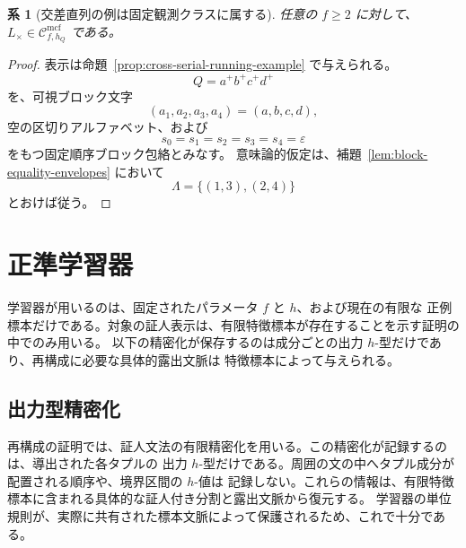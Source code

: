 \documentclass[11pt,a4paper]{ltjsarticle}
\newtheorem{corollary}[theorem]{系}
\theoremstyle{remark}
\newcommand{\Cmcf}[2]{\mathcal{C}^{\mathrm{mcf}}_{#1,#2}}
\newcommand{\eps}{\varepsilon}
\begin{document}
\begin{corollary}[交差直列の例は固定観測クラスに属する]
\label{cor:cross-serial-in-fixed-observation-class}
任意の \(f\ge2\) に対して、\(L_{\times}\in\Cmcf{f}{h_Q}\) である。
\end{corollary}

\begin{proof}
表示は命題~\ref{prop:cross-serial-running-example} で与えられる。
\[
  Q=a^+b^+c^+d^+
\]
を、可視ブロック文字
\[
  (a_1,a_2,a_3,a_4)=(a,b,c,d),
\]
空の区切りアルファベット、および
\[
  s_0=s_1=s_2=s_3=s_4=\eps
\]
をもつ固定順序ブロック包絡とみなす。
意味論的仮定は、補題~\ref{lem:block-equality-envelopes} において
\[
  \Lambda=\{(1,3),(2,4)\}
\]
とおけば従う。
\end{proof}

\section{正準学習器}
\label{sec:learner}

学習器が用いるのは、固定されたパラメータ \(f\) と \(h\)、および現在の有限な
正例標本だけである。対象の証人表示は、有限特徴標本が存在することを示す証明の中でのみ用いる。
以下の精密化が保存するのは成分ごとの出力 \(h\)-型だけであり、再構成に必要な具体的露出文脈は
特徴標本によって与えられる。

\subsection{出力型精密化}
\label{sec:refinement}

再構成の証明では、証人文法の有限精密化を用いる。この精密化が記録するのは、導出された各タプルの
出力 \(h\)-型だけである。周囲の文の中へタプル成分が配置される順序や、境界区間の \(h\)-値は
記録しない。これらの情報は、有限特徴標本に含まれる具体的な証人付き分割と露出文脈から復元する。
学習器の単位規則が、実際に共有された標本文脈によって保護されるため、これで十分である。
\end{document}
